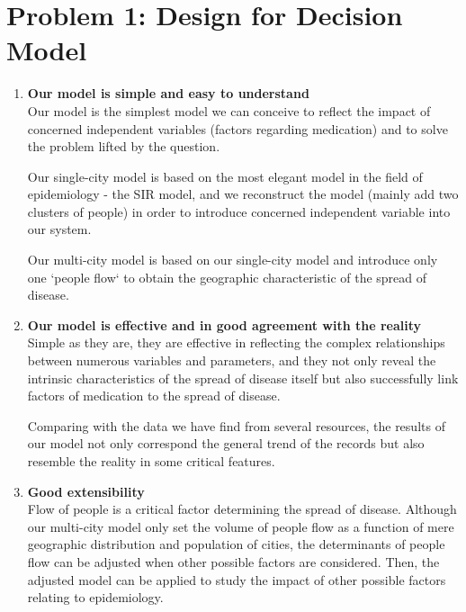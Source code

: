 \section{Problem 1: Design for Decision Model}
\begin{enumerate}
\item \textbf{Our model is simple and easy to understand} \\
Our model is the simplest model we can conceive to reflect the impact of concerned independent variables (factors regarding medication) and to solve the problem lifted by the question. 

Our single-city model is based on the most elegant model in the field of epidemiology - the SIR model, and we reconstruct the model (mainly add two clusters of people) in order to introduce concerned independent variable into our system. 

Our multi-city model is based on our single-city model and introduce only one `people flow` to obtain the geographic characteristic of the spread of disease.

\item \textbf{Our model is effective and in good agreement with the reality} \\
Simple as they are, they are effective in reflecting the complex relationships between numerous variables and parameters, and they not only reveal the intrinsic characteristics of the spread of disease itself but also successfully link factors of medication to the spread of disease.

Comparing with the data we have find from several resources, the results of our model not only correspond the general trend of the records but also resemble the reality in some critical features.

\item \textbf{Good extensibility} \\
Flow of people is a critical factor determining the spread of disease. Although our multi-city model only set the volume of people flow as a function of mere geographic distribution and population of cities, the determinants of people flow can be adjusted when other possible factors are considered. Then, the adjusted model can be applied to study the impact of other possible factors relating to epidemiology.

\end{enumerate}



